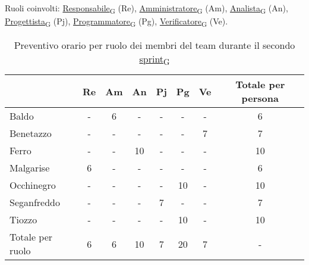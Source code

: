 Ruoli coinvolti: \href{https://7last.github.io/docs/pb/documentazione-interna/glossario\#responsabile}{Responsabile\textsubscript{G}} (Re), \href{https://7last.github.io/docs/pb/documentazione-interna/glossario\#amministratore}{Amministratore\textsubscript{G}} (Am), \href{https://7last.github.io/docs/pb/documentazione-interna/glossario\#analista}{Analista\textsubscript{G}} (An), \href{https://7last.github.io/docs/pb/documentazione-interna/glossario\#progettista}{Progettista\textsubscript{G}} (Pj), \href{https://7last.github.io/docs/pb/documentazione-interna/glossario\#programmatore}{Programmatore\textsubscript{G}} (Pg), \href{https://7last.github.io/docs/pb/documentazione-interna/glossario\#verificatore}{Verificatore\textsubscript{G}} (Ve).
\begin{table}[!h]
	\centering
	\begin{tabular}{ | l | c | c | c | c | c | c | c | }
		\hline
		\textbf{}        & \textbf{Re} & \textbf{Am} & \textbf{An} & \textbf{Pj} & \textbf{Pg} & \textbf{Ve} & \textbf{Totale per persona} \\
		\hline
		Baldo            & -           & 6           & -           & -           & -           & -           & 6                           \\
		Benetazzo        & -           & -           & -           & -           & -           & 7           & 7                           \\
		Ferro            & -           & -           & 10          & -           & -           & -           & 10                          \\
		Malgarise        & 6           & -           & -           & -           & -           & -           & 6                           \\
		Occhinegro       & -           & -           & -           & -           & 10          & -           & 10                          \\
		Seganfreddo      & -           & -           & -           & 7           & -           & -           & 7                           \\
		Tiozzo           & -           & -           & -           & -           & 10          & -           & 10                          \\
		\hline
		Totale per ruolo & 6           & 6           & 10          & 7           & 20          & 7           & -                           \\
		\hline
	\end{tabular}
	\caption{Preventivo orario per ruolo dei membri del team durante il secondo \href{https://7last.github.io/docs/pb/documentazione-interna/glossario\#sprint}{sprint\textsubscript{G}}}
	
\end{table}

